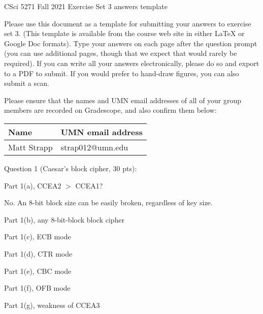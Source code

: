 \documentclass[11pt]{article}
\begin{document}
\begin{center}
CSci 5271 Fall 2021 Exercise Set 3 answers template
\end{center}

Please use this document as a template for submitting your answers to
exercise set 3. (This template is available from the course web site
in either LaTeX or Google Doc formats). Type your answers on each page
after the question prompt (you can use additional pages, though that
we expect that would rarely be required). If you can write all your
answers electronically, please do so and export to a PDF to submit.
If you would prefer to hand-draw figures, you can also submit a scan.

Please ensure that the names and UMN email addresses of all of your
group members are recorded on Gradescope, and also confirm them below:

\vspace{10pt}

\begin{tabular}{|p{2.6in}|p{2.6in}|}\hline
Name & UMN email address\\\hline
Matt Strapp & strap012@umn.edu\\\hline 

\end{tabular}

\vspace{10pt}

Question 1 (Caesar's block cipher, 30 pts):

Part 1(a), CCEA2 $>$ CCEA1?

No. An 8-bit block size can be easily broken, regardless of key size.

\vspace{0.5in}

Part 1(b), any 8-bit-block block cipher


\newpage

Part 1(c), ECB mode

\vspace{1.5in}

Part 1(d), CTR mode

\vspace{1.5in}

Part 1(e), CBC mode

\vspace{1.5in}

Part 1(f), OFB mode

\newpage

Part 1(g), weakness of CCEA3
\end{document}
